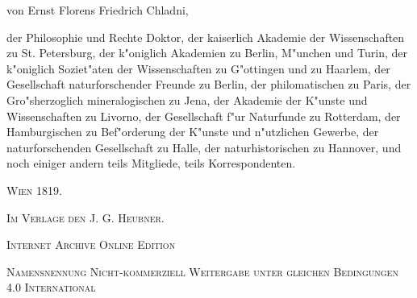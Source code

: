 \documentclass[a4paper, 11pt, oneside, polutonikogreek, german]{article}
\begin{document}
\begin{titlepage}
	{\large von Ernst Florens Friedrich Chladni,} %
	
	\vspace*{1\baselineskip} %
	
    {\normalsize der Philosophie und Rechte Doktor, der kaiserlich Akademie der Wissenschaften zu St. Petersburg, der k"oniglich Akademien zu Berlin, M"unchen und Turin, der k"oniglich Soziet"aten der Wissenschaften zu G"ottingen und zu Haarlem, der Gesellschaft naturforschender Freunde zu Berlin, der philomatischen zu Paris, der Gro"sherzoglich mineralogischen zu Jena, der Akademie der K"unste und Wissenschaften zu Livorno, der Gesellschaft f"ur Naturfunde zu Rotterdam, der Hamburgischen zu Bef"orderung der K"unste und n"utzlichen Gewerbe, der naturforschenden Gesellschaft zu Halle, der naturhistorischen zu Hannover, und noch einiger andern teils Mitgliede, teils Korrespondenten.} %
    
    \vspace*{\fill}

	\vspace{1\baselineskip}

	{\small\scshape Wien 1819.}
	
	{\small\scshape{Im Verlage den J. G. Heubner.}}
	
	\vspace{0.5\baselineskip} %

    \scshape Internet Archive Online Edition  %
	
	{\scshape\small Namensnennung Nicht-kommerziell Weitergabe unter gleichen Bedingungen 4.0 International} %
\end{titlepage}
\setlength{\parskip}{1mm plus1mm minus1mm}
\clearpage
\tableofcontents
\clearpage
\LARGE
\pagestyle{fancy}
\fancyhf{}
\cfoot{\frakfamily{\thepage}}
\section*{}
\end{document}
